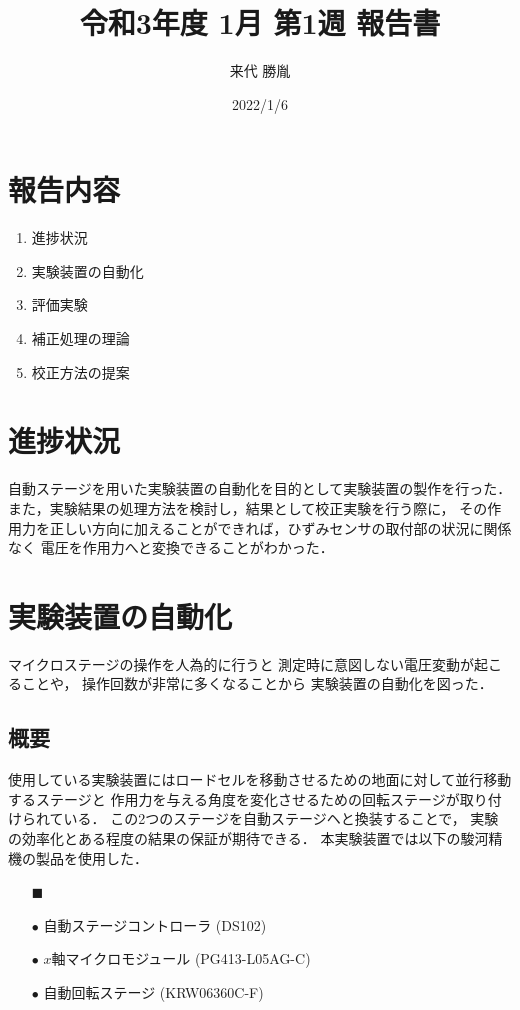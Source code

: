 \documentclass[twocolumn,a4j]{jsarticle}
\author{来代 勝胤}
\title{令和3年度 1月 第1週 報告書}
\date{2022/1/6}
\begin{document}
\columnseprule=0.1mm

\maketitle
\section*{報告内容}
\begin{enumerate}[1.]
    \item 進捗状況
    \item 実験装置の自動化
    \item 評価実験
    \item 補正処理の理論
    \item 校正方法の提案
\end{enumerate}

\section{進捗状況}
自動ステージを用いた実験装置の自動化を目的として実験装置の製作を行った．
また，実験結果の処理方法を検討し，結果として校正実験を行う際に，
その作用力を正しい方向に加えることができれば，ひずみセンサの取付部の状況に関係なく
電圧を作用力へと変換できることがわかった．

\section{実験装置の自動化}
マイクロステージの操作を人為的に行うと
測定時に意図しない電圧変動が起こることや，
操作回数が非常に多くなることから
実験装置の自動化を図った．\\

\subsection{概要}
使用している実験装置にはロードセルを移動させるための地面に対して並行移動するステージと
作用力を与える角度を変化させるための回転ステージが取り付けられている．
この2つのステージを自動ステージヘと換装することで，
実験の効率化とある程度の結果の保証が期待できる．
本実験装置では以下の駿河精機の製品を使用した．

\begin{itemize}
    \item [$\blacksquare$] 
    \item [$\bullet$] 自動ステージコントローラ (DS102)
    \item [$\bullet$] $x$軸マイクロモジュール (PG413-L05AG-C)
    \item [$\bullet$] 自動回転ステージ (KRW06360C-F)
\end{itemize}
\end{document}
